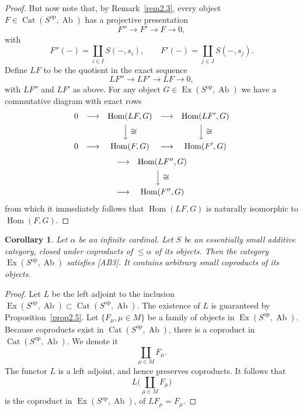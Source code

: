 \documentclass[11pt,a4paper]{article}
\theoremstyle{plain}
\newtheorem{corollary}[theorem]{Corollary}
\theoremstyle{definition}
\DeclareMathOperator{\Hom}{Hom}
\DeclareMathOperator{\Cat}{Cat}
\DeclareMathOperator{\Ex}{Ex}
\DeclareMathOperator{\Ab}{Ab}
\newcommand{\op}{\mathrm{op}}
\numberwithin{equation}{section}
\begin{document}
\begin{proof}
But now note that, by Remark~\ref{rem2.3}, every object $F \in \Cat(S^{\op},\Ab)$ has a projective presentation
\begin{equation*}
F'' \longrightarrow F' \longrightarrow F \longrightarrow 0,
\end{equation*}
with
\begin{equation*}
F''(-) = \coprod_{i\in I} S(-,s_{i}), \qquad F'(-) = \coprod_{j\in J} S(-,s_{j}).
\end{equation*}
Define $LF$ to be the quotient in the exact sequence
\begin{equation*}
LF'' \longrightarrow LF' \longrightarrow LF \longrightarrow 0,
\end{equation*}
with $LF''$ and $LF'$ as above. For any object $G \in \Ex(S^{\op},\Ab)$ we have a commutative diagram with exact rows
\begin{equation*}
\begin{array}{ccccc}
0 & \longrightarrow & \Hom(LF,G) & \longrightarrow & \Hom(LF',G) \\[4pt]
& & \Big\downarrow\cong & & \Big\downarrow\cong \\[6pt]
0 & \longrightarrow & \Hom(F,G) & \longrightarrow & \Hom(F',G)
\end{array}
\end{equation*}
\begin{equation*}
\begin{array}{ccc}
\longrightarrow & \Hom(LF'',G) \\[4pt]
& \Big\downarrow\cong \\[6pt]
\longrightarrow & \Hom(F'',G)
\end{array}
\end{equation*}
from which it immediately follows that $\Hom(LF,G)$ is naturally isomorphic to $\Hom(F,G)$.
\end{proof}

\begin{corollary}\label{cor2.6}
Let $\alpha$ be an infinite cardinal. Let $S$ be an essentially small additive category, closed under coproducts of $\leq\alpha$ of its objects. Then the category $\Ex(S^{\op},\Ab)$ satisfies [AB3]. It contains arbitrary small coproducts of its objects.
\end{corollary}

\begin{proof}
Let $L$ be the left adjoint to the inclusion $\Ex(S^{\op},\Ab) \subset \Cat(S^{\op},\Ab)$. The existence of $L$ is guaranteed by Proposition~\ref{prop2.5}. Let $\{F_{\mu}, \mu \in M\}$ be a family of objects in $\Ex(S^{\op},\Ab)$. Because coproducts exist in $\Cat(S^{\op},\Ab)$, there is a coproduct in $\Cat(S^{\op},\Ab)$. We denote it
\begin{equation*}
\coprod_{\mu\in M} F_{\mu}.
\end{equation*}
The functor $L$ is a left adjoint, and hence preserves coproducts. It follows that
\begin{equation*}
L\Big(\coprod_{\mu\in M} F_{\mu}\Big)
\end{equation*}
is the coproduct in $\Ex(S^{\op},\Ab)$, of $LF_{\mu} = F_{\mu}$.
\end{proof}
\end{document}

